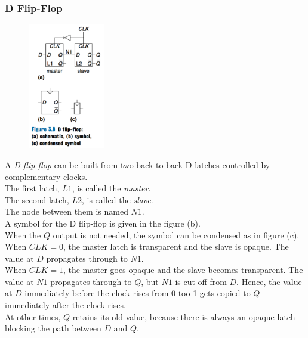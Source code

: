 \documentclass[12pt]{article}
\theoremstyle{definition}
\begin{document}
  \subsubsection{D Flip-Flop}
  \begin{figure}
    \centering
    \includegraphics[width=0.3\textwidth]{pictures/dFlipFlop.png}
  \end{figure}
  A \emph{D flip-flop} can be built from two back-to-back D latches controlled by complementary clocks. \\
  The first latch, $L1$, is called the \emph{master}. \\
  The second latch, $L2$, is called the \emph{slave}. \\
  The node between them is named $N1$. \\
  A symbol for the D flip-flop is given in the figure (b). \\
  When the $\overline{Q}$ output is not needed, the symbol can be condensed as in figure (c). \\

  When $CLK = 0$, the master latch is transparent and the slave is opaque.
  The value at $D$ propagates through to $N1$. \\
  When $CLK = 1$, the master goes opaque and the slave becomes transparent.
  The value at $N1$ propagates through to $Q$, but $N1$ is cut off from $D$.
  Hence, the value at $D$ immediately before the clock rises from 0 too 1 gets copied to $Q$ immediately after the clock rises. \\
  At other times, $Q$ retains its old value, because there is always an opaque latch blocking the path between $D$ and $Q$.
\end{document}
